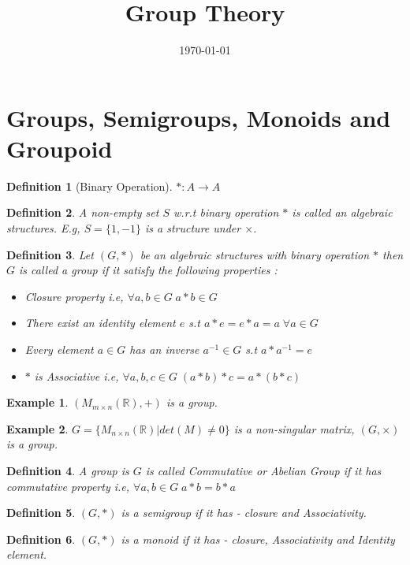 \documentclass[12pt,a4paper]{article}
\title{Group Theory \vspace{-2em}}
\date{\today}
\newcommand{\R}{\mathbb{R}}
\newtheorem*{defn}{Definition}
\newtheorem{ex}{Example}
\begin{document}
  \maketitle
  
  \section{Groups, Semigroups, Monoids and Groupoid}
  
  \begin{defn}[Binary Operation]
  	$*: A \to A$
  \end{defn}
  
  \begin{defn}\normalfont
   A non-empty set $S$ w.r.t binary operation $*$ is called an algebraic structures. E.g, $S=\{1,-1\}$ is a structure under $\times$.
  \end{defn}
  
 \begin{defn}\normalfont
 	    Let $(G,*)$ be an algebraic structures with binary operation $*$ then $G$ is called a group if it satisfy the following properties :
 	\begin{itemize}
 		\item Closure property i.e, $\forall a,b \in G\; a*b\in G$
 		\item There exist an identity element $e$ s.t $a*e=e*a=a\; \forall a\in G$
 		\item Every element $a\in G$ has an inverse $a^{-1}\in G$ s.t $a*a^{-1}=e$
 		\item $*$ is Associative i.e, $\forall a,b,c \in G\; (a*b)*c=a*(b*c)$
 	\end{itemize}
 \end{defn}
\begin{ex}
	$(M_{m\times n}(\R), +)$ is a group.
\end{ex}
\begin{ex}
	$G=\{M_{n\times n}(\R) | det(M) \ne 0 \}$ is a non-singular matrix, $(G,\times)$ is a group.
\end{ex}
\begin{defn}\normalfont
	A group is $G$ is called Commutative or Abelian Group if it has commutative property i.e, $\forall a,b\in G\; a*b=b*a$
\end{defn}
\begin{defn}\normalfont
	$(G,*)$ is a semigroup if it has - closure and Associativity.
\end{defn}
\begin{defn}\normalfont
	$(G,*)$ is a monoid if it has - closure, Associativity and Identity element.
\end{defn}
\end{document}
